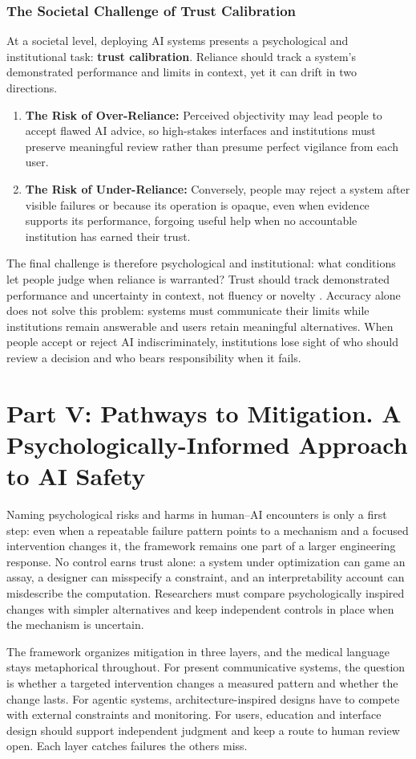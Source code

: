\documentclass{article}
\begin{document}
\subsubsection{The Societal Challenge of Trust Calibration}
At a societal level, deploying AI systems presents a psychological and institutional task: \textbf{trust calibration}. Reliance should track a system's demonstrated performance and limits in context, yet it can drift in two directions.
\begin{enumerate}
    \item \textbf{The Risk of Over-Reliance:} Perceived objectivity may lead people to accept flawed AI advice, so high-stakes interfaces and institutions must preserve meaningful review rather than presume perfect vigilance from each user.
    \item \textbf{The Risk of Under-Reliance:} Conversely, people may reject a system after visible failures or because its operation is opaque, even when evidence supports its performance, forgoing useful help when no accountable institution has earned their trust.
\end{enumerate}
The final challenge is therefore psychological and institutional: what conditions let people judge when reliance is warranted? Trust should track demonstrated performance and uncertainty in context, not fluency or novelty \citep{ref60}. Accuracy alone does not solve this problem: systems must communicate their limits while institutions remain answerable and users retain meaningful alternatives. When people accept or reject AI indiscriminately, institutions lose sight of who should review a decision and who bears responsibility when it fails.
\section{Part V: Pathways to Mitigation. A Psychologically-Informed Approach to AI Safety}
Naming psychological risks and harms in human--AI encounters is only a first step: even when a repeatable failure pattern points to a mechanism and a focused intervention changes it, the framework remains one part of a larger engineering response. No control earns trust alone: a system under optimization can game an assay, a designer can misspecify a constraint, and an interpretability account can misdescribe the computation. Researchers must compare psychologically inspired changes with simpler alternatives and keep independent controls in place when the mechanism is uncertain.

The framework organizes mitigation in three layers, and the medical language stays metaphorical throughout. For present communicative systems, the question is whether a targeted intervention changes a measured pattern and whether the change lasts. For agentic systems, architecture-inspired designs have to compete with external constraints and monitoring. For users, education and interface design should support independent judgment and keep a route to human review open. Each layer catches failures the others miss.
\end{document}
